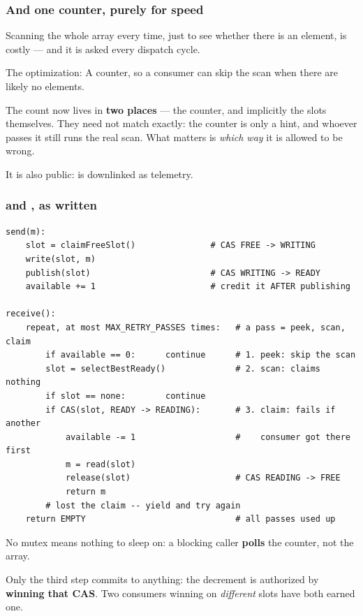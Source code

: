 \begin{frame}[fragile]
  \frametitle{And one counter, purely for speed} \small

Scanning the whole array every time, just to see whether there is an element, is
costly --- and it is asked every dispatch cycle.

\pause
\vspace{0.35cm}

\begin{block}{The optimization: }\small
A counter, so a consumer can skip the scan when there are likely no elements.

\vspace{0.15cm}

The count now lives in {\bf two places} --- the counter, and implicitly the slots
themselves. They need not match exactly: the counter is only a hint, and whoever
passes it still runs the real scan. What matters is {\em which way} it is allowed
to be wrong.

\vspace{0.15cm}

It is also public:  is downlinked as telemetry.
\end{block}

\end{frame}

\begin{frame}[fragile]
  \frametitle{ and , as written} \small

\begin{lstlisting}[style=shell]
send(m):
    slot = claimFreeSlot()               # CAS FREE -> WRITING
    write(slot, m)
    publish(slot)                        # CAS WRITING -> READY
    available += 1                       # credit it AFTER publishing

receive():
    repeat, at most MAX_RETRY_PASSES times:   # a pass = peek, scan, claim
        if available == 0:      continue      # 1. peek: skip the scan
        slot = selectBestReady()              # 2. scan: claims nothing
        if slot == none:        continue
        if CAS(slot, READY -> READING):       # 3. claim: fails if another
            available -= 1                    #    consumer got there first
            m = read(slot)
            release(slot)                     # CAS READING -> FREE
            return m
        # lost the claim -- yield and try again
    return EMPTY                              # all passes used up
\end{lstlisting}

\pause

No mutex means nothing to sleep on: a blocking caller {\bf polls} the counter, not
the array.

\pause

Only the third step commits to anything: the decrement is authorized by {\bf
winning that CAS}. Two consumers winning on {\em different} slots have both earned
one.

\end{frame}

